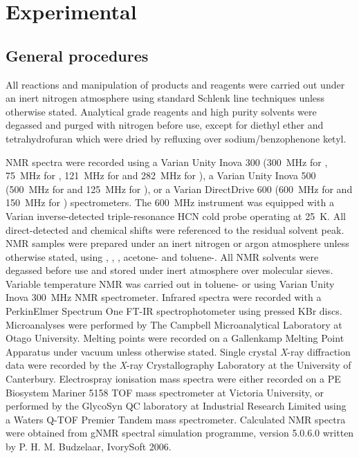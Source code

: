 
\chapter{Experimental}
\label{ch:expt}

\section{General procedures}
\label{section:generalprocedures}


All reactions and manipulation of products and reagents were carried out under an inert nitrogen atmosphere using standard Schlenk line techniques unless otherwise stated.  Analytical grade reagents and high purity solvents were degassed and purged with nitrogen before use, except for diethyl ether and tetrahydrofuran which were dried by refluxing over sodium/benzophenone ketyl.  

NMR spectra were recorded using a Varian Unity Inova 300 (300~MHz for \proton, 75~MHz for \carbon, 121~MHz for \phosphorus{} and 282~MHz for \fluorine), a Varian Unity Inova 500 (500~MHz for \proton{} and 125~MHz for \carbon), or a Varian DirectDrive 600 (600~MHz for \proton and 150~MHz for \carbon{}) spectrometers.   The 600~MHz instrument was equipped with a Varian inverse-detected triple-resonance HCN cold probe operating at 25~K.  All direct-detected \proton{} and \carbon{} chemical shifts were referenced to the residual solvent peak.\cite{Fulmer2010}  NMR samples were prepared under an inert nitrogen or argon atmosphere unless otherwise stated, using , , , acetone- and toluene-.  All NMR solvents were degassed before use and stored under inert atmosphere over molecular sieves.  Variable temperature NMR was carried out in toluene- or  using Varian Unity Inova 300~MHz NMR spectrometer.  Infrared spectra were recorded with a PerkinElmer Spectrum One FT-IR spectrophotometer using pressed KBr discs.  Microanalyses were performed by The Campbell Microanalytical Laboratory at Otago University.  Melting points were recorded on a Gallenkamp Melting Point Apparatus under vacuum unless otherwise stated. Single crystal \textit{X}-ray diffraction data were recorded by the \textit{X}-ray Crystallography Laboratory at the University of Canterbury.  Electrospray ionisation mass spectra were either recorded on a PE Biosystem Mariner 5158 TOF mass spectrometer at Victoria University, or performed by the GlycoSyn QC laboratory at Industrial Research Limited using a Waters Q-TOF Premier Tandem mass spectrometer.  Calculated \proton{} NMR spectra were obtained from gNMR spectral simulation programme, version 5.0.6.0 written by P. H. M. Budzelaar, IvorySoft 2006.


